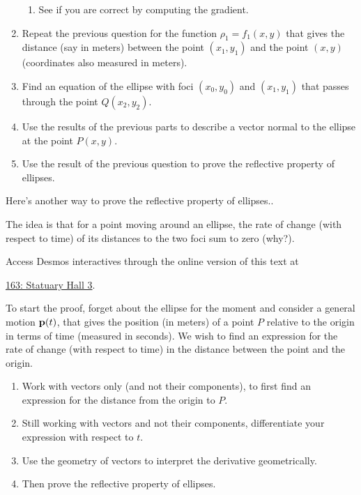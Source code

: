 \documentclass{ximera}
\begin{document}
\begin{question}
\begin{enumerate}
\begin{enumerate}
\item See if you are correct by computing the gradient.
\end{enumerate}

\item Repeat the previous question for the function $\rho_1 = f_1(x,y)$ that gives the distance (say in meters) between the point $(x_1, y_1)$ and the point $(x,y)$ (coordinates also measured in meters).

\item Find an equation of the ellipse with foci $(x_0,y_0)$ and $(x_1, y_1)$ that passes through the point $Q(x_2,y_2)$.

\item Use the results of the previous parts to describe a vector normal to the ellipse at the point $P(x,y)$.

\item Use the result of the previous question to prove the reflective property of ellipses.


\end{enumerate}
\end{question}


\begin{question}  \label{Q5445rggfbhyhyrdt}
Here's another way to prove the reflective property of ellipses..

The idea is that for a point moving around an ellipse, the rate of change (with respect to time) of its distances to the two foci sum to zero (why?).

\begin{onlineOnly}
    \begin{center}
\end{center}
\end{onlineOnly}

Access Desmos interactives through the online version of this text at
 
\href{https://www.desmos.com/3d/c9iyyxoqre}{163: Statuary Hall 3}.


To start the proof, forget about the ellipse for the moment and consider a general motion ${\bf p}(t)$, that gives the position (in meters) of a point $P$ relative to the origin in terms of time (measured in seconds). We wish to find an expression for the rate of change (with respect to time) in the distance between the point and the origin.

\begin{enumerate}
\item Work with vectors only (and not their components), to first find an expression for the distance from the origin to $P$.

\item Still working with vectors and not their components, differentiate your expression with respect to $t$.

\item Use the geometry of vectors to interpret the derivative geometrically.

\item Then prove the reflective property of ellipses. 
\end{enumerate}
\end{question}
\end{document}
